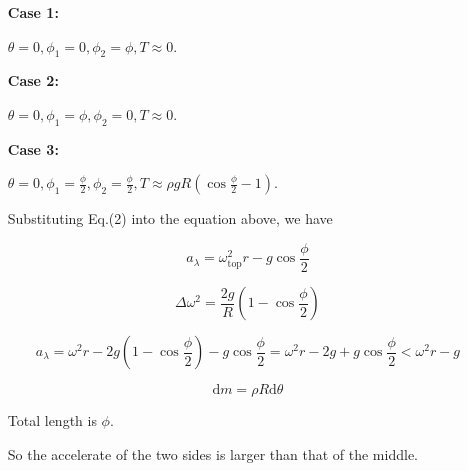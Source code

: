 \documentclass{article}
\begin{document}
    \begin{enumerate}

        \item[\textbf{Case 1:}] 
        
        $\theta=0,\phi_1=0,\phi_2=\phi,T\approx 0$.

        \item[\textbf{Case 2:}] 
        
        $\theta=0,\phi_1=\phi,\phi_2=0,T\approx 0$.

        \item[\textbf{Case 3:}] 
        
        $\theta=0,\phi_1=\frac{\phi}{2},\phi_2=\frac{\phi}{2},T\approx \rho gR(\cos\frac{\phi}{2}-1)$.

        Substituting Eq.(2) into the equation above, we have

        $$
        a_{\lambda}=\omega^2_{\mathrm{top}}r-g\cos\frac{\phi}{2}
        $$

        $$
        \Delta \omega^2=\frac{2g}{R}(1-\cos\frac{\phi}{2})
        $$

        $$
        a_{\lambda}=\omega^2r-2g(1-\cos\frac{\phi}{2})-g\cos\frac{\phi}{2}=\omega^2r-2g+g\cos\frac{\phi}{2}<\omega^2r-g
        $$

        $$
        \mathrm{d}m=\rho R\mathrm{d}\theta
        $$

        Total length is $\phi$.

        So the accelerate of the two sides is larger than that of the middle.

    \end{enumerate}
\end{document}
